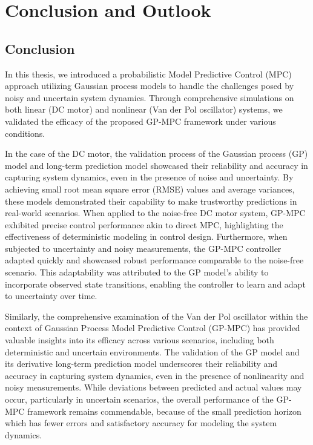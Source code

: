 \section{Conclusion and Outlook} \label{sec: Conc}

\subsection{Conclusion}
In this thesis, we introduced a probabilistic Model Predictive Control (MPC) approach utilizing Gaussian process models to handle the challenges posed by noisy and uncertain system dynamics. Through comprehensive simulations on both linear (DC motor) and nonlinear (Van der Pol oscillator) systems, we validated the efficacy of the proposed GP-MPC framework under various conditions.

In the case of the DC motor, the validation process of the Gaussian process (GP) model and long-term prediction model showcased their reliability and accuracy in capturing system dynamics, even in the presence of noise and uncertainty. By achieving small root mean square error (RMSE) values and average variances, these models demonstrated their capability to make trustworthy predictions in real-world scenarios. When applied to the noise-free DC motor system, GP-MPC exhibited precise control performance akin to direct MPC, highlighting the effectiveness of deterministic modeling in control design. Furthermore, when subjected to uncertainty and noisy measurements, the GP-MPC controller adapted quickly and showcased robust performance comparable to the noise-free scenario. This adaptability was attributed to the GP model's ability to incorporate observed state transitions, enabling the controller to learn and adapt to uncertainty over time.

Similarly, the comprehensive examination of the Van der Pol oscillator within the context of Gaussian Process Model Predictive Control (GP-MPC) has provided valuable insights into its efficacy across various scenarios, including both deterministic and uncertain environments. The validation of the GP model and its derivative long-term prediction model underscores their reliability and accuracy in capturing system dynamics, even in the presence of nonlinearity and noisy measurements. While deviations between predicted and actual values may occur, particularly in uncertain scenarios, the overall performance of the GP-MPC framework remains commendable, because of the small prediction horizon which has fewer errors and satisfactory accuracy for modeling the system dynamics.  

